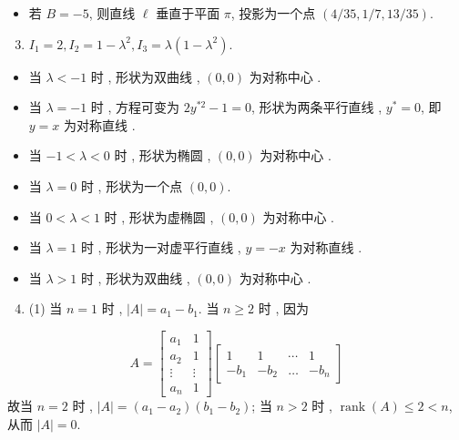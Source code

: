 \documentclass[10pt]{article}
\begin{document}
\begin{itemize}
  \item  若  $B=-5$,  则直线  $\ell$  垂直于平面  $\pi$,  投影为一个点  $(4 / 35,1 / 7,13 / 35)$.
\end{itemize}
\begin{enumerate}
  \setcounter{enumi}{2}
  \item $I_{1}=2, I_{2}=1-\lambda^{2}, I_{3}=\lambda\left(1-\lambda^{2}\right)$.
\end{enumerate}
\begin{itemize}
  \item  当  $\lambda<-1$  时 ,  形状为双曲线 , $(0,0)$  为对称中心 .

  \item  当  $\lambda=-1$  时 ,  方程可变为  $2 y^{* 2}-1=0$,  形状为两条平行直线 , $y^{*}=0$,  即  $y=x$  为对称直线 .

  \item  当  $-1<\lambda<0$  时 ,  形状为椭圆 , $(0,0)$  为对称中心 .

  \item  当  $\lambda=0$  时 ,  形状为一个点  $(0,0)$.

  \item  当  $0<\lambda<1$  时 ,  形状为虚椭圆 , $(0,0)$  为对称中心 .

  \item  当  $\lambda=1$  时 ,  形状为一对虚平行直线 , $y=-x$  为对称直线 .

  \item  当  $\lambda>1$  时 ,  形状为双曲线 , $(0,0)$  为对称中心 .

\end{itemize}
\begin{enumerate}
  \setcounter{enumi}{3}
  \item (1)  当  $n=1$  时 , $|A|=a_{1}-b_{1}$.  当  $n \geqslant 2$  时 ,  因为 
\end{enumerate}
$$
A=\left[\begin{array}{cc}
a_{1} & 1 \\
a_{2} & 1 \\
\vdots & \vdots \\
a_{n} & 1
\end{array}\right]\left[\begin{array}{cccc}
1 & 1 & \cdots & 1 \\
-b_{1} & -b_{2} & \ldots & -b_{n}
\end{array}\right]
$$
 故当  $n=2$  时 , $|A|=\left(a_{1}-a_{2}\right)\left(b_{1}-b_{2}\right)$;  当  $n>2$  时 , $\operatorname{rank}(A) \leqslant 2<n$,  从而  $|A|=0$.
\end{document}
